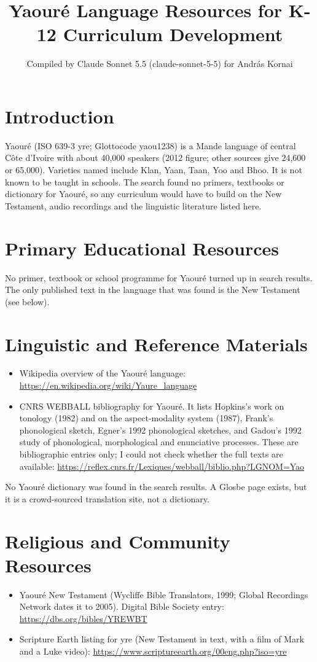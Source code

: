 \documentclass[12pt]{article}
\title{Yaour\'e Language Resources for K-12 Curriculum Development}
\author{Compiled by Claude Sonnet 5.5 (claude-sonnet-5-5) for Andr\'as Kornai}
\date{}
\begin{document}
\maketitle

\section{Introduction}
Yaour\'e (ISO 639-3 yre; Glottocode yaou1238) is a Mande language of central C\^ote d'Ivoire with about 40,000 speakers (2012 figure; other sources give 24,600 or 65,000). Varieties named include Klan, Yaan, Taan, Yoo and Bhoo. It is not known to be taught in schools. The search found no primers, textbooks or dictionary for Yaour\'e, so any curriculum would have to build on the New Testament, audio recordings and the linguistic literature listed here.

\section{Primary Educational Resources}
No primer, textbook or school programme for Yaour\'e turned up in search results. The only published text in the language that was found is the New Testament (see below).

\section{Linguistic and Reference Materials}
\begin{itemize}
\item Wikipedia overview of the Yaour\'e language: \url{https://en.wikipedia.org/wiki/Yaure_language}
\item CNRS WEBBALL bibliography for Yaour\'e. It lists Hopkins's work on tonology (1982) and on the aspect-modality system (1987), Frank's phonological sketch, Egner's 1992 phonological sketches, and Gadou's 1992 study of phonological, morphological and enunciative processes. These are bibliographic entries only; I could not check whether the full texts are available: \url{https://reflex.cnrs.fr/Lexiques/webball/biblio.php?LGNOM=Yao}
\end{itemize}
No Yaour\'e dictionary was found in the search results. A Glosbe page exists, but it is a crowd-sourced translation site, not a dictionary.

\section{Religious and Community Resources}
\begin{itemize}
\item Yaour\'e New Testament (Wycliffe Bible Translators, 1999; Global Recordings Network dates it to 2005). Digital Bible Society entry: \url{https://dbs.org/bibles/YREWBT}
\item Scripture Earth listing for yre (New Testament in text, with a film of Mark and a Luke video): \url{https://www.scriptureearth.org/00eng.php?iso=yre}
\end{itemize}
\end{document}
